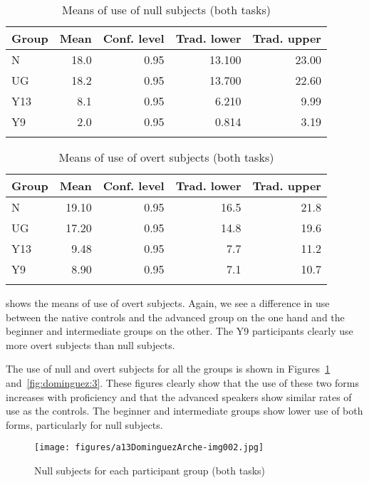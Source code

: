 \documentclass[output=paper]{langscibook}
\begin{document}
\begin{table}
\caption{Means of use of null subjects (both tasks)}
\label{tab:dominguez:2}
\begin{tabular}{l *{4}{r}}
\lsptoprule
Group & Mean & Conf. level & Trad. lower & Trad. upper\\
\midrule
N & 18.0 & 0.95 & 13.100 & 23.00\\
UG & 18.2 & 0.95 & 13.700 & 22.60\\
Y13 & 8.1 & 0.95 & 6.210 & 9.99\\
Y9 & 2.0 & 0.95 & 0.814 & 3.19\\
\lspbottomrule
\end{tabular}
\end{table}

\begin{table}
\caption{\label{tab:dominguez:3} Means of use of overt subjects (both tasks)}
\begin{tabular}{l *{4}{r}}
\lsptoprule
Group & Mean & Conf. level & Trad. lower & Trad. upper\\
\midrule
N & 19.10 & 0.95 & 16.5 & 21.8\\
UG & 17.20 & 0.95 & 14.8 & 19.6\\
Y13 & 9.48 & 0.95 & 7.7 & 11.2\\
Y9 & 8.90 & 0.95 & 7.1 & 10.7\\
\lspbottomrule
\end{tabular}
\end{table}

 shows the means of use of overt subjects. Again, we see a difference in use between the native controls and the advanced group on the one hand and the beginner and intermediate groups on the other. The Y9 participants clearly use more overt subjects than null subjects.

The use of null and overt subjects for all the groups is shown in Figures~\ref{fig:dominguez:2} and~\ref{fig:dominguez:3}. These figures clearly show that the use of these two forms increases with proficiency and that the advanced speakers show similar rates of use as the controls. The beginner and intermediate groups show lower use of both forms, particularly for null subjects.

\begin{figure}[p]
\caption{Null subjects for each participant group (both tasks)}
\texttt{[image: figures/a13DominguezArche-img002.jpg]}
\label{fig:dominguez:2}
\end{figure}
\end{document}
